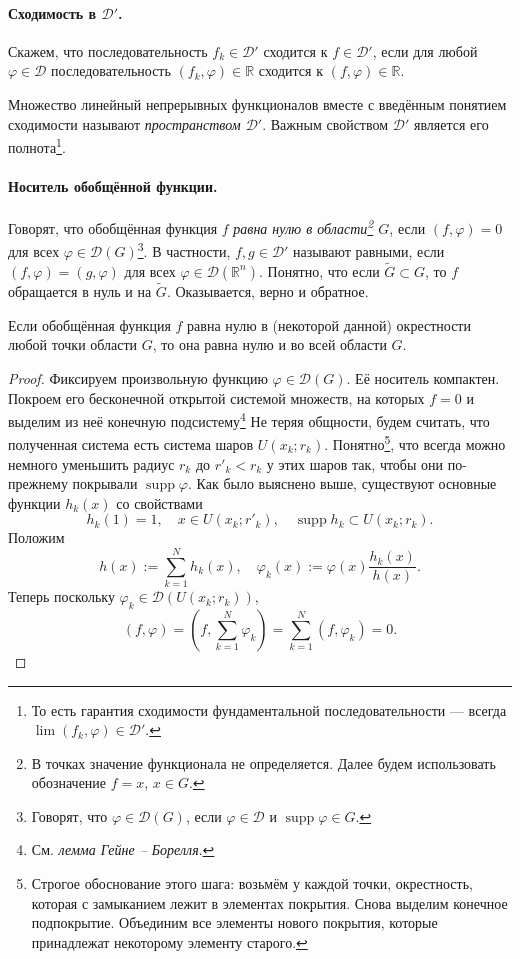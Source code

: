\paragraph{Сходимость в $ \mathcal D' $.}
Скажем, что последовательность $ f_k \in \mathcal D' $ сходится к $ f \in
\mathcal D' $, если для любой $ \varphi \in \mathcal D $ последовательность $
(f_k, \varphi) \in \mathbb R$ сходится к $ (f, \varphi) \in \mathbb R $.

Множество линейный непрерывных функционалов вместе с введённым понятием
сходимости называют \emph{пространством $ \mathcal D' $}. Важным свойством $
\mathcal D' $ является его полнота\footnote{То есть гарантия сходимости
фундаментальной последовательности --- всегда $ \lim(f_k, \varphi) \in \mathcal
D'$.}.

\paragraph{Носитель обобщённой функции.} Говорят, что обобщённая функция $ f $
\emph{равна нулю в области\footnote{В точках значение функционала не
    определяется.
Далее будем использовать обозначение $ f = x $, $ x\in G $.} $ G $}, если $ (f,\varphi)  = 0 $ для
всех $ \varphi
\in \mathcal D(G)$\footnote{Говорят, что $ \varphi \in\mathcal D(G) $, если $ \varphi \in \mathcal
D$ и $ \operatorname{supp} \varphi \in G $.}. В частности, $ f, g \in \mathcal
D' $ называют равными, если $ (f,\varphi) = (g,\varphi) $ для всех $ \varphi \in
\mathcal D(\mathbb R^n)$. Понятно, что если $ \tilde G \subset G $, то $ f $
обращается в нуль и на $ \tilde G $. Оказывается, верно и обратное.

\begin{theorem} Если обобщённая функция $ f $ равна нулю в (некоторой данной) окрестности любой
  точки области $ G $, то она равна нулю и во всей области $ G $.
\end{theorem}
\begin{proof}
Фиксируем произвольную функцию $ \varphi \in \mathcal D(G) $. Её носитель
компактен. Покроем его бесконечной открытой системой множеств, на которых $ f =
0$ и выделим из неё конечную подсистему\footnote{См. \emph{лемма Гейне --
Борелля}.} Не теряя общности, будем считать, что полученная система есть система
шаров $ U(x_k; r_k) $. Понятно\footnote{Строгое обоснование этого шага: возьмём
у каждой точки, окрестность, которая с замыканием лежит в элементах покрытия.
Снова выделим конечное подпокрытие. Объединим все элементы нового покрытия,
которые принадлежат некоторому элементу старого.}, что всегда можно немного уменьшить радиус $ r_k
$ до $ r'_k < r_k $ у этих шаров так, чтобы они по-прежнему покрывали $ \operatorname{supp}\varphi
$. Как было выяснено выше, существуют основные функции $ h_k(x) $ со
свойствами 
\[
  h_k(1) = 1, \quad x \in U(x_k; r'_k), \quad \operatorname{supp}h_k \subset
  U(x_k; r_k).
\]
Положим  
\[
  h(x) := \sum_{k=1}^N h_k(x), \quad \varphi_k(x) := \varphi(x)
  \frac{h_k(x)}{h(x)}.
\]
Теперь поскольку $ \varphi_k \in \mathcal D(U(x_k; r_k)) $, 
\[
  (f,\varphi) = \left(f, \sum_{k=1}^N \varphi_k\right) =
  \sum_{k=1}^N(f,\varphi_k) = 0.
\]
\end{proof}

